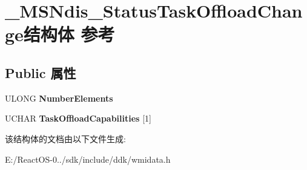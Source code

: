 \hypertarget{struct___m_s_ndis___status_task_offload_change}{}\section{\+\_\+\+M\+S\+Ndis\+\_\+\+Status\+Task\+Offload\+Change结构体 参考}
\label{struct___m_s_ndis___status_task_offload_change}
\subsection*{Public 属性}
\begin{DoxyCompactItemize}
\item 
\mbox{\label{struct___m_s_ndis___status_task_offload_change_a2fa698973e4358d72ea96ec8549e3655}} 
U\+L\+O\+NG {\bfseries Number\+Elements}
\item 
\mbox{\label{struct___m_s_ndis___status_task_offload_change_acef2d98a4c4c95d3325bf038b639622b}} 
U\+C\+H\+AR {\bfseries Task\+Offload\+Capabilities} \mbox{[}1\mbox{]}
\end{DoxyCompactItemize}


该结构体的文档由以下文件生成\+:\begin{DoxyCompactItemize}
\item 
E\+:/\+React\+O\+S-\/0../sdk/include/ddk/wmidata.\+h\end{DoxyCompactItemize}
